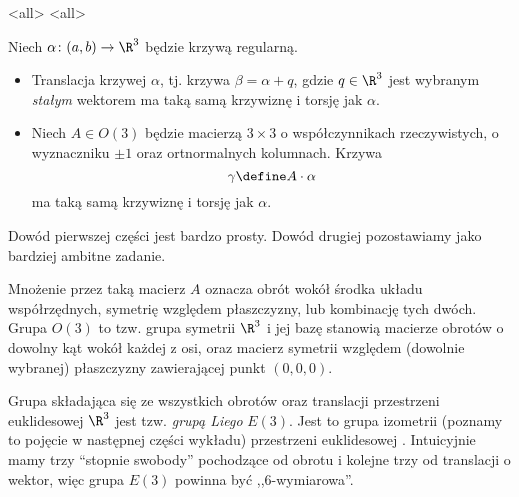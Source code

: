 \mode*
\mode<all>{}
\mode<all>{}
\begin{frame}[<+->]
\begin{lemat}
Niech $\alpha\colon (a,b)\to \R^3$ będzie krzywą regularną. 
\begin{itemize}
\item Translacja krzywej $\alpha$, tj. krzywa $\beta=\alpha+q$, gdzie $q\in \R^3$ jest wybranym \textit{stałym} wektorem ma taką samą krzywiznę i torsję jak $\alpha$.
\item Niech $A\in O(3)$ będzie macierzą $3\times 3$ o współczynnikach 
rzeczywistych, o wyznaczniku $\pm1$ oraz ortnormalnych kolumnach. Krzywa 
\[\gamma\define A\cdot\alpha\] ma taką samą krzywiznę i torsję jak $\alpha$.
\end{itemize}
\end{lemat}

\begin{uwaga}
Dowód pierwszej części jest bardzo prosty. Dowód drugiej pozostawiamy jako bardziej ambitne zadanie.
\end{uwaga}

\end{frame}
\begin{frame}[<+->]

Mnożenie przez taką macierz $A$ oznacza obrót wokół środka układu współrzędnych, symetrię względem płaszczyzny, lub kombinację tych dwóch. Grupa $O(3)$ to tzw. grupa symetrii $\R^3$ i jej bazę stanowią macierze obrotów o dowolny kąt wokół każdej z osi, oraz macierz symetrii względem (dowolnie wybranej) płaszczyzny zawierającej punkt $(0,0,0)$.

\end{frame}
\begin{uwaga}
Grupa składająca się ze wszystkich obrotów oraz translacji przestrzeni 
euklidesowej $\R^3$ jest tzw. \textit{grupą Liego} $E(3)$. Jest to grupa 
izometrii (poznamy to pojęcie w następnej części wykładu) przestrzeni 
euklidesowej . Intuicyjnie mamy trzy ``stopnie swobody'' pochodzące od obrotu i 
kolejne trzy od translacji o wektor, więc grupa $E(3)$ powinna być 
,,$6$-wymiarowa''. 
\end{uwaga}


